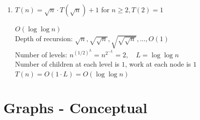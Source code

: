 \documentclass[fleqn]{article}
\begin{document}
\begin{enumerate}
    \item $T(n) = \sqrt{n} \cdot T(\sqrt{n}) + 1$ for $n \geq 2, T(2) = 1$
    \begin{answer}
        $O(\log \log n)$ \\
        Depth of recursion: $\sqrt{n}, \sqrt{\sqrt{n}}, \sqrt{\sqrt{\sqrt{n}}}, ..., O(1)$ \\
        Number of levels: $n^{(1/2)^L} = n^{2^{-L}} = 2, \quad L = \log\log n$ \\
        Number of children at each level is $1$, work at each node is $1$ \\
        $T(n) = O(1 \cdot L) = O(\log \log n)$
    \end{answer}
\end{enumerate}

\section{Graphs - Conceptual}
\end{document}
